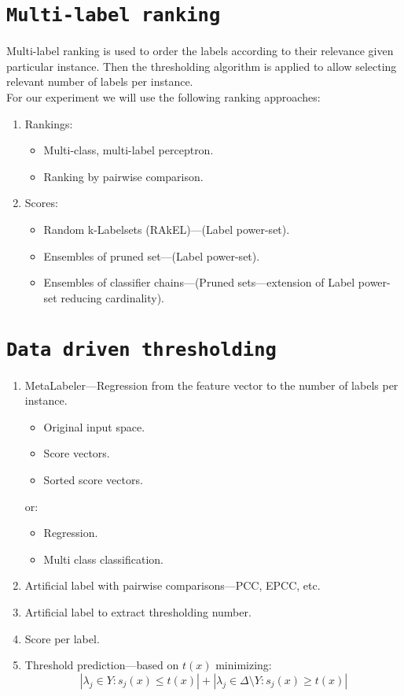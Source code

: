 \documentclass[12pt,a4paper,twocolumn]{article}
\begin{document}
\section*{\texttt{Multi-label ranking}}
Multi-label ranking is used to order the labels according to their relevance given particular instance. Then the thresholding algorithm is applied to allow selecting relevant number of labels per instance.\\
For our experiment we will use the following ranking approaches:
\begin{enumerate}
\item Rankings:
	\begin{itemize}
	\item Multi-class, multi-label perceptron.
	\item Ranking by pairwise comparison.
	\end{itemize}
\item Scores:
	\begin{itemize}
	\item Random k-Labelsets (RAkEL)---(Label power-set).
	\item Ensembles of pruned set---(Label power-set).
	\item Ensembles of classifier chains---(Pruned sets---extension of Label power-set reducing cardinality).
	\end{itemize}
\end{enumerate}


\section*{\texttt{Data driven thresholding}}
\begin{enumerate}
\item MetaLabeler---Regression from the feature vector to the number of labels per instance.
	\begin{itemize} %
	\item Original input space.
	\item Score vectors.
	\item Sorted score vectors.
	\end{itemize}

	or:

	\begin{itemize} %
	\item Regression.
	\item Multi class classification.
	\end{itemize}

\item Artificial label with pairwise comparisons---PCC, EPCC, etc.
\item Artificial label to extract thresholding number.
\item Score per label.
\item Threshold prediction---based on $t(x)$ minimizing:
	$$
	| \lambda_j \in Y : s_j(x) \leq t(x) | + | \lambda_j \in \Delta \text{\textbackslash{}} Y : s_j(x) \geq t(x) |
	$$
\end{enumerate}
\end{document}
